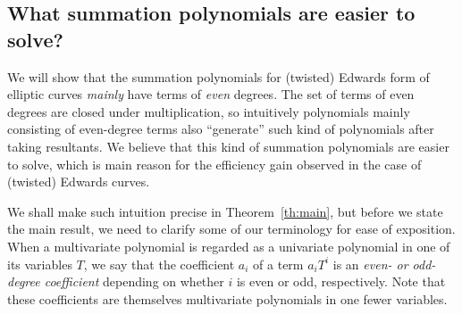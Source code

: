 %
%

\subsection{What summation polynomials are easier to solve?}
\label{sec:twisted-edwards-summation-polynomial}

%
%



We will show that the summation polynomials for (twisted) Edwards form
of elliptic curves \emph{mainly} have terms of \emph{even} degrees.
%
The set of terms of even degrees are closed under multiplication, so
intuitively polynomials mainly consisting of even-degree terms also
``generate'' such kind of polynomials after taking resultants.
%
We believe that this kind of summation polynomials are easier to
solve, which is main reason for the efficiency gain observed in the
case of (twisted) Edwards curves.

We shall make such intuition precise in Theorem~\ref{th:main}, but
before we state the main result, we need to clarify some of our
terminology for ease of exposition.
%
When a multivariate polynomial is regarded as a univariate polynomial
in one of its variables $T$, we say that the coefficient $a_i$ of a
term $a_iT^i$ is an \emph{even- or odd-degree coefficient} depending
on whether $i$ is even or odd, respectively.
%
Note that these coefficients are themselves multivariate polynomials
in one fewer variables.

